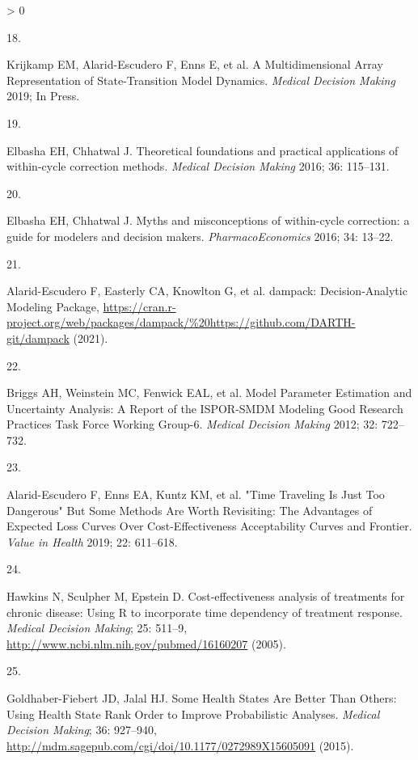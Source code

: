 \documentclass[
]{article}
\newlength{\cslhangindent}
\newlength{\csllabelwidth}
\newenvironment{CSLReferences}[2] %
 {%
  \setlength{\parindent}{0pt}
  \ifodd #1 \everypar{\setlength{\hangindent}{\cslhangindent}}\ignorespaces\fi
  \ifnum #2 > 0
  \setlength{\parskip}{#2\baselineskip}
  \fi
 }%
 {}
\newcommand{\CSLLeftMargin}[1]{\parbox[t]{\csllabelwidth}{#1}}
\newcommand{\CSLRightInline}[1]{\parbox[t]{\linewidth - \csllabelwidth}{#1}\break}
\begin{document}
\begin{CSLReferences}{0}{0}
\leavevmode\hypertarget{ref-Krijkamp2019}{}%
\CSLLeftMargin{18. }
\CSLRightInline{Krijkamp EM, Alarid-Escudero F, Enns E, et al. {A Multidimensional Array Representation of State-Transition Model Dynamics}. \emph{Medical Decision Making} 2019; In Press.}

\leavevmode\hypertarget{ref-Elbasha2016}{}%
\CSLLeftMargin{19. }
\CSLRightInline{Elbasha EH, Chhatwal J. {Theoretical foundations and practical applications of within-cycle correction methods}. \emph{Medical Decision Making} 2016; 36: 115--131.}

\leavevmode\hypertarget{ref-Elbasha2016a}{}%
\CSLLeftMargin{20. }
\CSLRightInline{Elbasha EH, Chhatwal J. {Myths and misconceptions of within-cycle correction: a guide for modelers and decision makers}. \emph{PharmacoEconomics} 2016; 34: 13--22.}

\leavevmode\hypertarget{ref-Alarid-Escudero2021}{}%
\CSLLeftMargin{21. }
\CSLRightInline{Alarid-Escudero F, Easterly CA, Knowlton G, et al. {dampack: Decision-Analytic Modeling Package}, \url{https://cran.r-project.org/web/packages/dampack/\%20https://github.com/DARTH-git/dampack} (2021).}

\leavevmode\hypertarget{ref-Briggs2012}{}%
\CSLLeftMargin{22. }
\CSLRightInline{Briggs AH, Weinstein MC, Fenwick EAL, et al. {Model Parameter Estimation and Uncertainty Analysis: A Report of the ISPOR-SMDM Modeling Good Research Practices Task Force Working Group-6.} \emph{Medical Decision Making} 2012; 32: 722--732.}

\leavevmode\hypertarget{ref-Alarid-Escudero2019}{}%
\CSLLeftMargin{23. }
\CSLRightInline{Alarid-Escudero F, Enns EA, Kuntz KM, et al. {"Time Traveling Is Just Too Dangerous" But Some Methods Are Worth Revisiting: The Advantages of Expected Loss Curves Over Cost-Effectiveness Acceptability Curves and Frontier}. \emph{Value in Health} 2019; 22: 611--618.}

\leavevmode\hypertarget{ref-Hawkins2005}{}%
\CSLLeftMargin{24. }
\CSLRightInline{Hawkins N, Sculpher M, Epstein D. {Cost-effectiveness analysis of treatments for chronic disease: Using R to incorporate time dependency of treatment response.} \emph{Medical Decision Making}; 25: 511--9, \url{http://www.ncbi.nlm.nih.gov/pubmed/16160207} (2005).}

\leavevmode\hypertarget{ref-Goldhaber-Fiebert2015}{}%
\CSLLeftMargin{25. }
\CSLRightInline{Goldhaber-Fiebert JD, Jalal HJ. {Some Health States Are Better Than Others: Using Health State Rank Order to Improve Probabilistic Analyses}. \emph{Medical Decision Making}; 36: 927--940, \url{http://mdm.sagepub.com/cgi/doi/10.1177/0272989X15605091} (2015).}


\end{CSLReferences}
\end{document}
